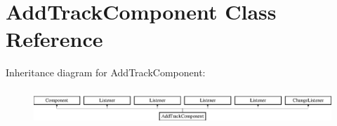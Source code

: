 \hypertarget{class_add_track_component}{}\section{Add\+Track\+Component Class Reference}
\label{class_add_track_component}
Inheritance diagram for Add\+Track\+Component\+:\begin{figure}[H]
\begin{center}
\leavevmode
\includegraphics[height=1.352657cm]{class_add_track_component}
\end{center}
\end{figure}
